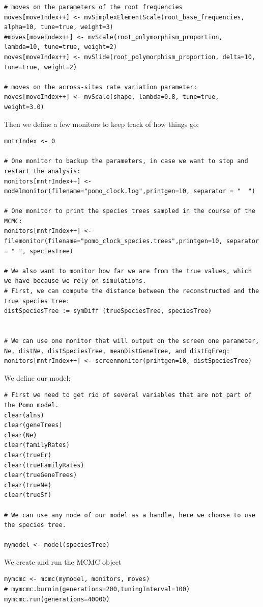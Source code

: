 \documentclass[11pt]{article}
\begin{document}
{\begin{framed}
{\begin{snugshade*}
\begin{lstlisting}
# moves on the parameters of the root frequencies
moves[moveIndex++] <- mvSimplexElementScale(root_base_frequencies, alpha=10, tune=true, weight=3) 
#moves[moveIndex++] <- mvScale(root_polymorphism_proportion, lambda=10, tune=true, weight=2) 
moves[moveIndex++] <- mvSlide(root_polymorphism_proportion, delta=10, tune=true, weight=2) 

# moves on the across-sites rate variation parameter:
moves[moveIndex++] <- mvScale(shape, lambda=0.8, tune=true, weight=3.0)
\end{lstlisting}
\end{snugshade*}}

Then we define a few monitors to keep track of how things go:
 {\tt \begin{snugshade*}
\begin{lstlisting}
mntrIndex <- 0

# One monitor to backup the parameters, in case we want to stop and restart the analysis:
monitors[mntrIndex++] <- modelmonitor(filename="pomo_clock.log",printgen=10, separator = "	")

# One monitor to print the species trees sampled in the course of the MCMC:
monitors[mntrIndex++] <- filemonitor(filename="pomo_clock_species.trees",printgen=10, separator = "	", speciesTree)

# We also want to monitor how far we are from the true values, which we have because we rely on simulations.
# First, we can compute the distance between the reconstructed and the true species tree:
distSpeciesTree := symDiff (trueSpeciesTree, speciesTree)


# We can use one monitor that will output on the screen one parameter, Ne, distNe, distSpeciesTree, meanDistGeneTree, and distEqFreq:
monitors[mntrIndex++] <- screenmonitor(printgen=10, distSpeciesTree)
\end{lstlisting}
\end{snugshade*}}
We define our model:
 {\tt \begin{snugshade*}
\begin{lstlisting}
# First we need to get rid of several variables that are not part of the Pomo model.
clear(alns)
clear(geneTrees)
clear(Ne)
clear(familyRates)
clear(trueEr)
clear(trueFamilyRates)
clear(trueGeneTrees)
clear(trueNe)
clear(trueSf)

# We can use any node of our model as a handle, here we choose to use the species tree.
 
mymodel <- model(speciesTree)
\end{lstlisting}
\end{snugshade*}}

We create and run the MCMC object

 {\tt \begin{snugshade*}
\begin{lstlisting}
mymcmc <- mcmc(mymodel, monitors, moves)
# mymcmc.burnin(generations=200,tuningInterval=100)
mymcmc.run(generations=40000)
\end{lstlisting}
\end{snugshade*}}
 \end{framed}}
\end{document}
